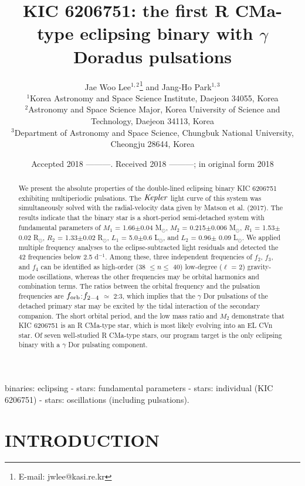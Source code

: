 \documentclass[useAMS,usenatbib,usegraphicx]{mn2e}
\title[KIC 6206751: a pulsating R CMa eclipsing binary]{KIC 6206751: the first R CMa-type eclipsing binary with $\gamma$ Doradus pulsations}
\author[Lee \& Park]
       {Jae Woo Lee$^{1,2}$\thanks{E-mail: jwlee@kasi.re.kr} and Jang-Ho Park$^{1,3}$ \\
        $^1$Korea Astronomy and Space Science Institute, Daejeon 34055, Korea \\
        $^2$Astronomy and Space Science Major, Korea University of Science and Technology, Daejeon 34113, Korea \\
        $^3$Department of Astronomy and Space Science, Chungbuk National University, Cheongju 28644, Korea }
\begin{document}
\date{Accepted 2018 ---------. Received 2018 ---------; in original form 2018 }

\pagerange{\pageref{firstpage}--\pageref{lastpage}} 

\maketitle

\label{firstpage}


\begin{abstract}
We present the absolute properties of the double-lined eclipsing binary KIC 6206751 exhibiting multiperiodic pulsations. 
The ${\it Kepler}$ light curve of this system was simultaneously solved with the radial-velocity data given by 
Matson et al. (2017). The results indicate that the binary star is a short-period semi-detached system with 
fundamental parameters of $M_1$ = 1.66$\pm$0.04 M$_\odot$, $M_2$ = 0.215$\pm$0.006 M$_\odot$, $R_1$ = 1.53$\pm$0.02 R$_\odot$, 
$R_2$ = 1.33$\pm$0.02 R$_\odot$, $L_1$ = 5.0$\pm$0.6 L$_\odot$, and $L_2$ = 0.96$\pm$ 0.09 L$_\odot$. We applied 
multiple frequency analyses to the eclipse-subtracted light residuals and detected the 42 frequencies below 2.5 d$^{-1}$. 
Among these, three independent frequencies of $f_2$, $f_3$, and $f_4$ can be identified as high-order (38 $\le n \le$ 40) 
low-degree ($\ell$ = 2) gravity-mode oscillations, whereas the other frequencies may be orbital harmonics and 
combination terms. The ratios between the orbital frequency and the pulsation frequencies are 
$f_{\rm orb}$:$f_{\rm 2-4}$ $\simeq$ 2:3, which implies that the $\gamma$ Dor pulsations of the detached primary star 
may be excited by the tidal interaction of the secondary companion. The short orbital period, and the low mass ratio 
and $M_2$ demonstrate that KIC 6206751 is an R CMa-type star, which is most likely evolving into an EL CVn star. Of seven 
well-studied R CMa-type stars, our program target is the only eclipsing binary with a $\gamma$ Dor pulsating component. 
\end{abstract}

\begin{keywords}
binaries: eclipsing - stars: fundamental parameters - stars: individual (KIC 6206751) - stars: oscillations (including pulsations).
\end{keywords}


\section{INTRODUCTION}
\end{document}
